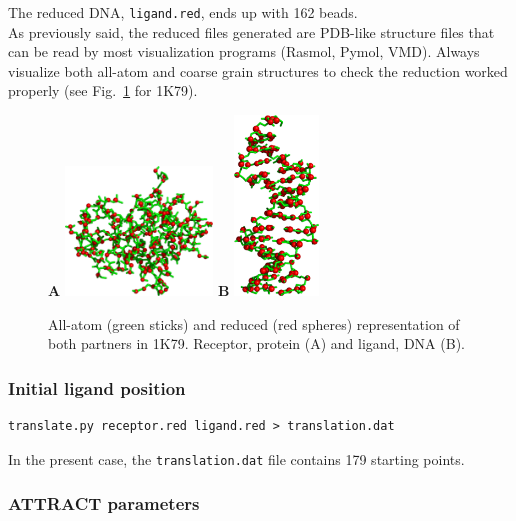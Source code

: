 \documentclass[12pt,a4paper]{article}
\begin{document}
The reduced DNA, {\tt ligand.red}, ends up with 162 beads. \\

As previously said, the reduced files generated are PDB-like structure files 
that can be read by most visualization programs (Rasmol, Pymol, VMD). 
Always visualize both all-atom and coarse grain structures to check the 
reduction worked properly (see Fig.~\ref{1K79_at_cg} for 1K79).

\begin{figure}[htbp]
\center
{\textbf A}
\includegraphics*[width=0.35\textwidth]{img/1K79_receptor.png}
\hspace*{2cm}
{\textbf B}
\includegraphics*[width=0.20\textwidth]{img/1K79_ligand.png}
\caption{All-atom (green sticks) and reduced (red spheres) representation 
of both partners in 1K79. Receptor, protein (A) and ligand, DNA (B).}
\label{1K79_at_cg}
\end{figure}

\subsubsection{Initial ligand position}

\begin{verbatim}
translate.py receptor.red ligand.red > translation.dat
\end{verbatim}

In the present case, the {\tt translation.dat} file contains 179 starting points.

\subsubsection{ATTRACT parameters}
\end{document}
